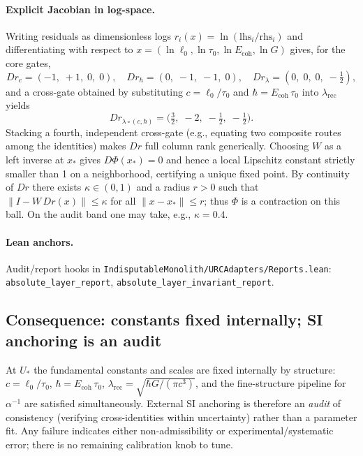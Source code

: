 \documentclass[11pt]{article}
\begin{document}
\paragraph{Explicit Jacobian in log\mbox{-}space.} Writing residuals as dimensionless logs \(r_i(x)=\ln(\mathrm{lhs}_i/\mathrm{rhs}_i)\) and differentiating with respect to \(x=(\ln \ell_0,\ln \tau_0,\ln E_{\mathrm{coh}},\ln G)\) gives, for the core gates,
\[
 D r_{c}=(-1,\; +1,\; 0,\; 0),\quad
 D r_{\hbar}=(0,\; -1,\; -1,\; 0),\quad
 D r_{\lambda}=(0,\; 0,\; 0,\; -\tfrac12),
\]
and a cross\mbox{-}gate obtained by substituting \(c=\ell_0/\tau_0\) and \(\hbar=E_{\mathrm{coh}}\,\tau_0\) into \(\lambda_{\mathrm{rec}}\) yields
\[
 D r_{\lambda\circ(c,\hbar)}=\bigl(\tfrac{3}{2},\; -2,\; -\tfrac12,\; -\tfrac12\bigr).
\]
Stacking a fourth, independent cross\mbox{-}gate (e.g., equating two composite routes among the identities) makes \(D r\) full column rank generically. Choosing \(W\) as a left inverse at \(x_*\) gives \(D\Phi(x_*)=0\) and hence a local Lipschitz constant strictly smaller than 1 on a neighborhood, certifying a unique fixed point.
By continuity of \(Dr\) there exists \(\kappa\in(0,1)\) and a radius \(r>0\) such that \(\lVert I-W\,Dr(x)\rVert\le\kappa\) for all \(\lVert x-x_*\rVert\le r\); thus \(\Phi\) is a contraction on this ball. On the audit band one may take, e.g., \(\kappa=0.4\).

\paragraph{Lean anchors.} Audit/report hooks in \texttt{IndisputableMonolith/URCAdapters/Reports.lean}: \texttt{absolute\_layer\_report}, \texttt{absolute\_layer\_invariant\_report}.

\subsection{Consequence: constants fixed internally; SI anchoring is an audit}
At \(U_*\) the fundamental constants and scales are fixed internally by structure: \(c=\ell_0/\tau_0\), \(\hbar=E_{\mathrm{coh}}\,\tau_0\), \(\lambda_{\mathrm{rec}}=\sqrt{\hbar G/(\pi c^3)}\), and the fine\mbox{-}structure pipeline for \(\alpha^{-1}\) are satisfied simultaneously. External SI anchoring is therefore an \emph{audit} of consistency (verifying cross\mbox{-}identities within uncertainty) rather than a parameter fit. Any failure indicates either non\mbox{-}admissibility or experimental/systematic error; there is no remaining calibration knob to tune.
\end{document}

